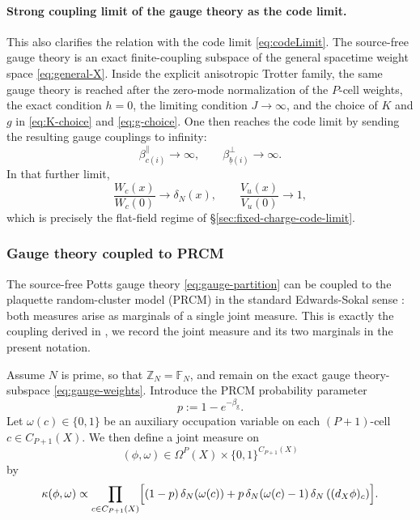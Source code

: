 \documentclass[dvipsnames,a4paper]{article}
\numberwithin{equation}{section}
\theoremstyle{definition}
\theoremstyle{remark}
\begin{document}
\paragraph{Strong coupling limit of the gauge theory as the code limit.}
This also clarifies the relation with the code limit
\eqref{eq:codeLimit}. The source-free gauge theory is an exact finite-coupling
subspace of the general spacetime weight space \eqref{eq:general-X}. Inside
the explicit anisotropic Trotter family, the same gauge theory is reached after
the zero-mode normalization of the \(P\)-cell weights, the exact condition
\(h=0\), the limiting condition \(J\to\infty\), and the choice of \(K\) and
\(g\) in \eqref{eq:K-choice} and \eqref{eq:g-choice}. One then reaches the
code limit by sending the resulting gauge couplings to infinity:
\begin{equation}
	\beta_{c(i)}^{\parallel}\to\infty,
	\qquad
	\beta_{\underline b(i)}^{\perp}\to\infty.
\end{equation}
In that further limit,
\begin{equation}
	\frac{W_c(x)}{W_c(0)}\to \delta_N(x),
	\qquad
	\frac{V_u(x)}{V_u(0)}\to 1,
\end{equation}
which is precisely the flat-field regime of
\S\ref{sec:fixed-charge-code-limit}. %


\subsubsection{Gauge theory coupled to PRCM}
The source-free Potts gauge theory \eqref{eq:gauge-partition} can be coupled to
the plaquette random-cluster model (PRCM) in the standard Edwards-Sokal sense \cite{EdwardsSokal1988}: both
measures arise as marginals of a single joint measure. This is exactly the coupling derived in
\cite[Prop.~20]{DuncanSchweinhartTopological}, we record the joint measure
and its two marginals in the present notation.

Assume \(N\) is prime, so that \(\mathbb Z_N=\mathbb F_N\), and remain on the
exact gauge theory-subspace \eqref{eq:gauge-weights}. Introduce the PRCM probability parameter
\begin{equation}
	p:=1-e^{-\beta_{\mathrm g}}.
	\label{eq:p-from-beta}
\end{equation}
Let \(\omega(c)\in\{0,1\}\) be an auxiliary occupation variable on each
\((P+1)\)-cell \(c\in C_{P+1}(X)\). We then define a joint measure on
\begin{equation}
	(\phi,\omega)\in \Omega^P(X)\times \{0,1\}^{C_{P+1}(X)}
\end{equation}
by
\begin{equation}
	\kappa(\phi,\omega)
	\propto
	\prod_{c\in C_{P+1}(X)}
	\Bigl[
	(1-p)\,\delta_N(\omega(c))
	+
	p\,\delta_N(\omega(c)-1)\,\delta_N\left((d_X\phi)_c\right)
	\Bigr].
	\label{eq:joint-gauge-prcm}
\end{equation}
\end{document}
